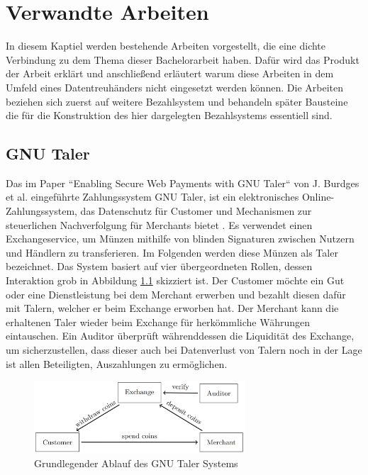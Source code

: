\documentclass{scrreprt}
\begin{document}
\chapter{Verwandte Arbeiten}
In diesem Kaptiel werden bestehende Arbeiten vorgestellt, die eine dichte Verbindung zu dem Thema dieser Bachelorarbeit haben. Dafür wird das Produkt der Arbeit erklärt und anschließend erläutert warum diese Arbeiten in dem Umfeld eines Datentreuhänders nicht eingesetzt werden können. Die Arbeiten beziehen sich zuerst auf weitere Bezahlsystem und behandeln später Bausteine die für die Konstruktion des hier dargelegten Bezahlsystems essentiell sind.

\section{GNU Taler}
\label{subsec:gnu}
Das im Paper ``Enabling Secure Web Payments with GNU Taler`` von J. Burdges et al. eingeführte Zahlungssystem GNU Taler, ist ein elektronisches Online-Zahlungssystem, das Datenschutz für Customer und Mechanismen zur steuerlichen Nachverfolgung für Merchants bietet \cite{gnu-burdges2016enabling}. Es verwendet einen Exchangeservice, um Münzen mithilfe von blinden Signaturen zwischen Nutzern und Händlern zu transferieren. Im Folgenden werden diese Münzen als Taler bezeichnet. Das System basiert auf vier übergeordneten Rollen, dessen Interaktion grob in Abbildung \ref{fig:gnu_taler_overview} skizziert ist. Der Customer möchte ein Gut oder eine Dienstleistung bei dem Merchant erwerben und bezahlt diesen dafür mit Talern, welcher er beim Exchange erworben hat. Der Merchant kann die erhaltenen Taler wieder beim Exchange für herkömmliche Währungen eintauschen. Ein Auditor überprüft währenddessen die Liquidität des Exchange, um sicherzustellen, dass dieser auch bei Datenverlust von Talern noch in der Lage ist allen Beteiligten, Auszahlungen zu ermöglichen.

\begin{figure}[H]
    \centering
    \includegraphics[width=0.7\textwidth]{gnu_system_graphic.png}
    \caption{Grundlegender Ablauf des GNU Taler Systems \cite{gnu-burdges2016enabling}}
    \label{fig:gnu_taler_overview}
\end{figure}
\end{document}
